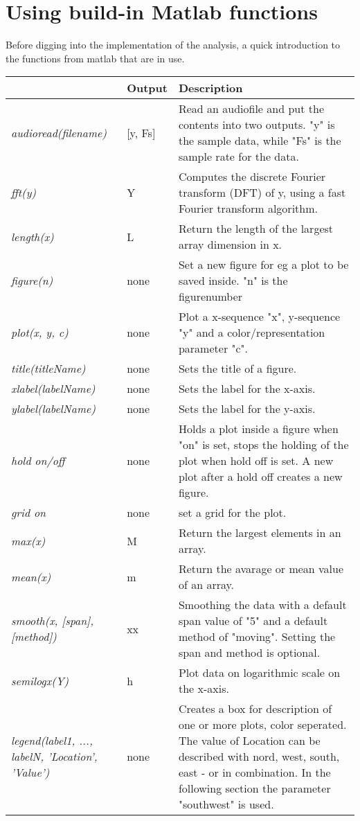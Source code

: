 \section{Using build-in Matlab functions}
\label{sec:functions}
Before digging into the implementation of the analysis, a quick introduction to the functions from matlab that are in use.
\begin{longtabu}{>{\em}X l X}
 & Output & \textbf{Description} \\
\hline
audioread(filename) & [y, Fs] & Read an audiofile and put the contents into two outputs. "y" is the sample data, while "Fs" is the sample rate for the data. \\
fft(y) & Y & Computes the discrete Fourier transform (DFT) of y, using a fast Fourier transform algorithm. \\
length(x) & L & Return the length of the largest array dimension in x.  \\
figure(n) & none & Set a new figure for eg a plot to be saved inside. "n" is the figurenumber \\
plot(x, y, c) & none & Plot a x-sequence "x", y-sequence "y" and a color/representation parameter "c". \\
title(titleName) & none & Sets the title of a figure. \\
xlabel(labelName) & none & Sets the label for the x-axis. \\
ylabel(labelName) & none & Sets the label for the y-axis. \\
hold on/off & none & Holds a plot inside a figure when "on" is set, stops the holding of the plot when hold off is set. A new plot after a hold off creates a new figure. \\
grid on & none & set a grid for the plot. \\
max(x) & M & Return the largest elements in an array. \\
mean(x) & m & Return the avarage or mean value of an array. \\
smooth(x, [span], [method]) & xx & Smoothing the data with a default span value of "5" and a default method of "moving". Setting the span and method is optional.\\
semilogx(Y) & h & Plot data on logarithmic scale on the x-axis. \\
legend(label1, ..., labelN, 'Location', 'Value') & none & Creates a box for description of one or more plots, color seperated. The value of Location can be described with nord, west, south, east - or in combination. In the following section the parameter "southwest" is used. \\

\end{longtabu}
